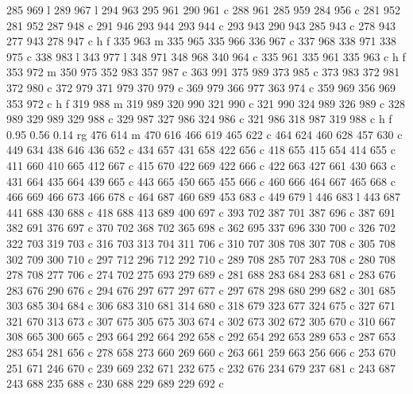 {{        285 969 l
        289 967 l
        294 963 295 961 290 961 c
        288 961 285 959 284 956 c
        281 952 281 952 287 948 c
        291 946 293 944 293 944 c
        293 943 290 943 285 943 c
        278 943 277 943 278 947 c
        h f
        335 963 m
        335 965 335 966 336 967 c
        337 968 338 971 338 975 c
        338 983 l
        343 977 l
        348 971 348 968 340 964 c
        335 961 335 961 335 963 c
        h f
        353 972 m
        350 975 352 983 357 987 c
        363 991 375 989 373 985 c
        373 983 372 981 372 980 c
        372 979 371 979 370 979 c
        369 979 366 977 363 974 c
        359 969 356 969 353 972 c
        h f
        319 988 m
        319 989 320 990 321 990 c
        321 990 324 989 326 989 c
        328 989 329 989 329 988 c
        329 987 327 986 324 986 c
        321 986 318 987 319 988 c
        h f
        0.95 0.56 0.14 rg
        476 614 m
        470 616 466 619 465 622 c
        464 624 460 628 457 630 c
        449 634 438 646 436 652 c
        434 657 431 658 422 656 c
        418 655 415 654 414 655 c
        411 660 410 665 412 667 c
        415 670 422 669 422 666 c
        422 663 427 661 430 663 c
        431 664 435 664 439 665 c
        443 665 450 665 455 666 c
        460 666 464 667 465 668 c
        466 669 466 673 466 678 c
        464 687 460 689 453 683 c
        449 679 l
        446 683 l
        443 687 441 688 430 688 c
        418 688 413 689 400 697 c
        393 702 387 701 387 696 c
        387 691 382 691 376 697 c
        370 702 368 702 365 698 c
        362 695 337 696 330 700 c
        326 702 322 703 319 703 c
        316 703 313 704 311 706 c
        310 707 308 708 307 708 c
        305 708 302 709 300 710 c
        297 712 296 712 292 710 c
        289 708 285 707 283 708 c
        280 708 278 708 277 706 c
        274 702 275 693 279 689 c
        281 688 283 684 283 681 c
        283 676 283 676 290 676 c
        294 676 297 677 297 677 c
        297 678 298 680 299 682 c
        301 685 303 685 304 684 c
        306 683 310 681 314 680 c
        318 679 323 677 324 675 c
        327 671 321 670 313 673 c
        307 675 305 675 303 674 c
        302 673 302 672 305 670 c
        310 667 308 665 300 665 c
        293 664 292 664 292 658 c
        292 654 292 653 289 653 c
        287 653 283 654 281 656 c
        278 658 273 660 269 660 c
        263 661 259 663 256 666 c
        253 670 251 671 246 670 c
        239 669 232 671 232 675 c
        232 676 234 679 237 681 c
        243 687 243 688 235 688 c
        230 688 229 689 229 692 c
}}
